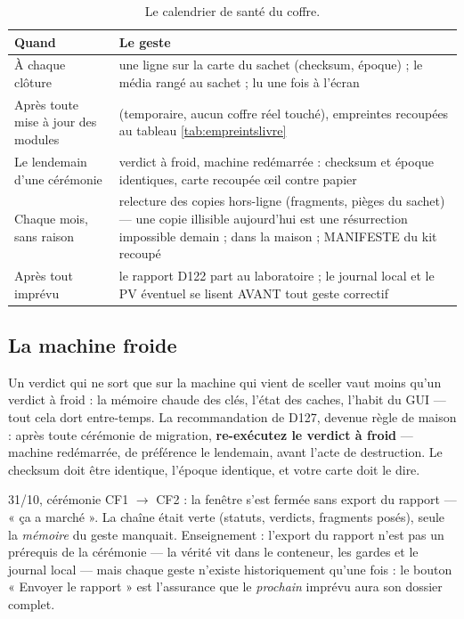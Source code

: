 \begin{table}[htbp]
\centering\small
\caption{Le calendrier de santé du coffre.}
\label{tab:calendrier}
\begin{tabularx}{\textwidth}{@{}l Y@{}}
\toprule
\textbf{Quand} & \textbf{Le geste} \\
\midrule
À chaque clôture & une ligne sur la carte du sachet (checksum, époque) ; le média
rangé au sachet ;  lu une fois à l'écran \\
Après toute mise à jour des modules &  (temporaire, aucun
coffre réel touché), empreintes recoupées au tableau \ref{tab:empreintslivre} \\
Le lendemain d'une cérémonie & verdict à froid, machine redémarrée : checksum et
époque identiques, carte recoupée œil contre papier \\
Chaque mois, sans raison & relecture des copies hors-ligne (fragments, pièges du
sachet) — une copie illisible aujourd'hui est une résurrection impossible demain ;
 dans la maison ; MANIFESTE du kit recoupé \\
Après tout imprévu & le rapport D122 part au laboratoire ; le journal local et le PV
éventuel se lisent AVANT tout geste correctif \\
\bottomrule
\end{tabularx}
\end{table}

\subsection{La machine froide}\label{sec:froide}

Un verdict qui ne sort que sur la machine qui vient de sceller vaut moins qu'un
verdict à froid : la mémoire chaude des clés, l'état des caches, l'habit du GUI —
tout cela dort entre-temps. La recommandation de D127, devenue règle de maison :
après toute cérémonie de migration, \textbf{re-exécutez le verdict à froid} — machine
redémarrée, de préférence le lendemain, avant l'acte de destruction. Le checksum doit
être identique, l'époque identique, et votre carte doit le dire.

\begin{terrain}
31/10, cérémonie CF1 $\to$ CF2 : la fenêtre s'est fermée sans export du rapport —
« ça a marché ». La chaîne était verte (statuts, verdicts, fragments posés), seule la
\emph{mémoire} du geste manquait. Enseignement : l'export du rapport n'est pas un
prérequis de la cérémonie — la vérité vit dans le conteneur, les gardes et le
journal local — mais chaque geste n'existe historiquement qu'une fois : le bouton
« Envoyer le rapport » est l'assurance que le \emph{prochain} imprévu aura son
dossier complet.
\end{terrain}

